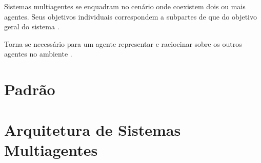 Sistemas multiagentes se enquadram no cenário onde coexistem dois ou mais agentes. Seus objetivos individuais  correspondem a subpartes de que do objetivo geral do sistema \cite{mcarthur2007multi}.

Torna-se necessário para um agente representar e raciocinar sobre os outros agentes no ambiente \cite[pág. 887]{van2008handbook}. 


\section{Padrão}

\section{Arquitetura de Sistemas Multiagentes}



